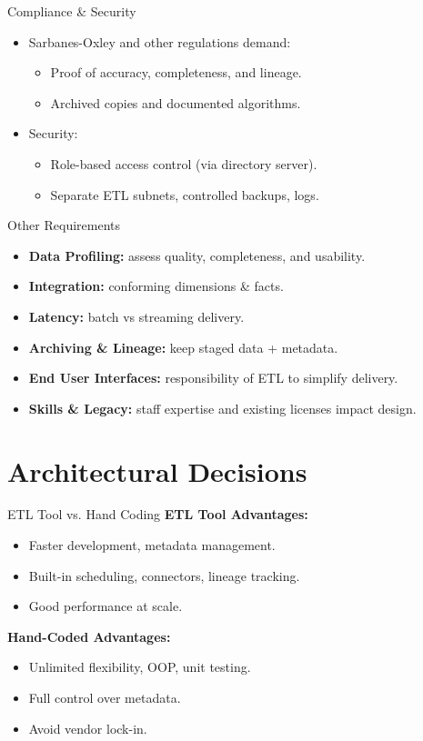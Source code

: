 \documentclass[aspectratio=169]{beamer}
\begin{document}
\begin{frame}{Compliance \& Security}
    \begin{itemize}
        \item Sarbanes-Oxley and other regulations demand:
        \begin{itemize}
            \item Proof of accuracy, completeness, and lineage.
            \item Archived copies and documented algorithms.
        \end{itemize}
        \item Security:
        \begin{itemize}
            \item Role-based access control (via directory server).
            \item Separate ETL subnets, controlled backups, logs.
        \end{itemize}
    \end{itemize}
\end{frame}

\begin{frame}{Other Requirements}
    \begin{itemize}
        \item \textbf{Data Profiling:} assess quality, completeness, and usability.
        \item \textbf{Integration:} conforming dimensions \& facts.
        \item \textbf{Latency:} batch vs streaming delivery.
        \item \textbf{Archiving \& Lineage:} keep staged data + metadata.
        \item \textbf{End User Interfaces:} responsibility of ETL to simplify delivery.
        \item \textbf{Skills \& Legacy:} staff expertise and existing licenses impact design.
    \end{itemize}
\end{frame}

\section{Architectural Decisions}

\begin{frame}{ETL Tool vs. Hand Coding}
    \textbf{ETL Tool Advantages:}
    \begin{itemize}
        \item Faster development, metadata management.
        \item Built-in scheduling, connectors, lineage tracking.
        \item Good performance at scale.
    \end{itemize}
    \textbf{Hand-Coded Advantages:}
    \begin{itemize}
        \item Unlimited flexibility, OOP, unit testing.
        \item Full control over metadata.
        \item Avoid vendor lock-in.
    \end{itemize}
\end{frame}
\end{document}
